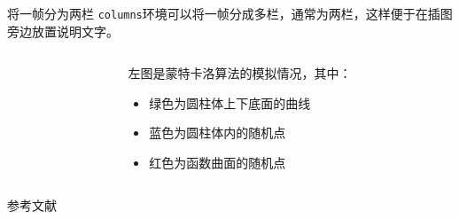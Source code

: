 \documentclass[14pt,hyperref={CJKbookmarks=true}]{beamer} %
\begin{document}
\begin{frame}{将一帧分为两栏}
	\texttt{columns}环境可以将一帧分成多栏，通常为两栏，这样便于在插图旁边放置说明文字。
	\begin{columns}[onlytextwidth]  %
		\begin{column}{0.55\textwidth}
		\end{column}
	\begin{column}{0.45\textwidth}
		左图是蒙特卡洛算法的模拟情况，其中：
		\begin{itemize}
			\item  绿色为圆柱体上下底面的曲线
			\item  蓝色为圆柱体内的随机点
			\item  红色为函数曲面的随机点
		\end{itemize}
	\end{column}
	\end{columns}
\end{frame}
\begin{frame}{参考文献}
\begin{thebibliography}{10}
	
\end{thebibliography}
\end{frame}
\end{document}
